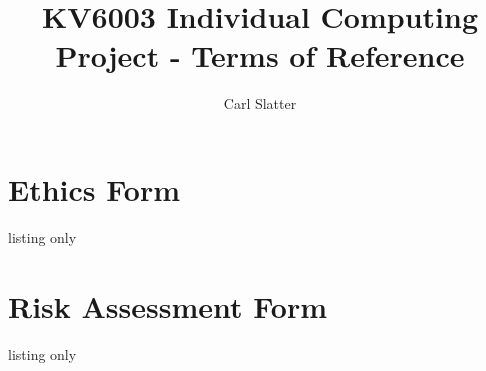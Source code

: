 \documentclass[12pt,a4paper]{article}
\title{ KV6003 Individual Computing Project - Terms of Reference }
\author{Carl Slatter}
\begin{document}
\maketitle




\appendix

\section{Ethics Form}
\begin{tcblisting}{listing only}

\end{tcblisting}


\section{Risk Assessment Form}
\begin{tcblisting}{listing only}

\end{tcblisting}
\end{document}

